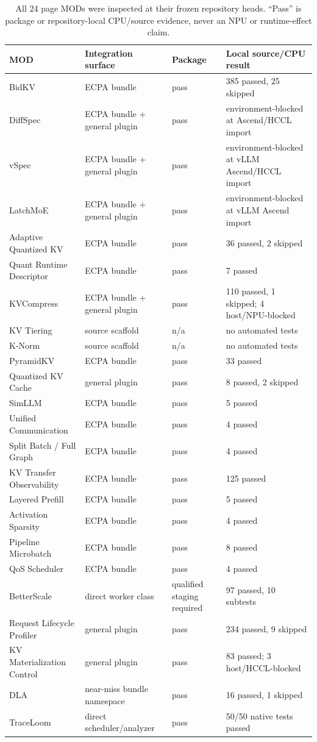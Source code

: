 \documentclass[letterpaper,twocolumn,10pt]{article}
\begin{document}
\begin{table}[t]
\centering\scriptsize
\caption{All 24 page MODs were inspected at their frozen repository heads. ``Pass''
is package or repository-local CPU/source evidence, never an NPU or runtime-effect claim.}
\begin{tabularx}{\textwidth}{@{}l l l X@{}}
\toprule
MOD & Integration surface & Package & Local source/CPU result \\
\midrule
BidKV & ECPA bundle & pass & 385 passed, 25 skipped \\
DiffSpec & ECPA bundle + general plugin & pass & environment-blocked at Ascend/HCCL import \\
vSpec & ECPA bundle + general plugin & pass & environment-blocked at vLLM Ascend/HCCL import \\
LatchMoE & ECPA bundle + general plugin & pass & environment-blocked at vLLM Ascend import \\
Adaptive Quantized KV & ECPA bundle & pass & 36 passed, 2 skipped \\
Quant Runtime Descriptor & ECPA bundle & pass & 7 passed \\
KVCompress & ECPA bundle + general plugin & pass & 110 passed, 1 skipped; 4 host/NPU-blocked \\
KV Tiering & source scaffold & n/a & no automated tests \\
K-Norm & source scaffold & n/a & no automated tests \\
PyramidKV & ECPA bundle & pass & 33 passed \\
Quantized KV Cache & general plugin & pass & 8 passed, 2 skipped \\
SimLLM & ECPA bundle & pass & 5 passed \\
Unified Communication & ECPA bundle & pass & 4 passed \\
Split Batch / Full Graph & ECPA bundle & pass & 4 passed \\
KV Transfer Observability & ECPA bundle & pass & 125 passed \\
Layered Prefill & ECPA bundle & pass & 5 passed \\
Activation Sparsity & ECPA bundle & pass & 4 passed \\
Pipeline Microbatch & ECPA bundle & pass & 8 passed \\
QoS Scheduler & ECPA bundle & pass & 4 passed \\
BetterScale & direct worker class & qualified staging required & 97 passed, 10 subtests \\
Request Lifecycle Profiler & general plugin & pass & 234 passed, 9 skipped \\
KV Materialization Control & general plugin & pass & 83 passed; 3 host/HCCL-blocked \\
DLA & near-miss bundle namespace & pass & 16 passed, 1 skipped \\
TraceLoom & direct scheduler/analyzer & pass & 50/50 native tests passed \\
\bottomrule
\end{tabularx}
\label{tab:all-workshop-mods}
\end{table}
\end{document}
